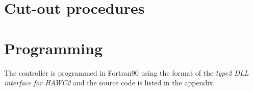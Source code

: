 \section{Cut-out procedures} \label{s:cutout}






\section{Programming}

The controller is programmed in Fortran90 using the format of the \emph{type2 DLL interface for HAWC2} \cite{Larsen12} and the source code is listed in the appendix.
